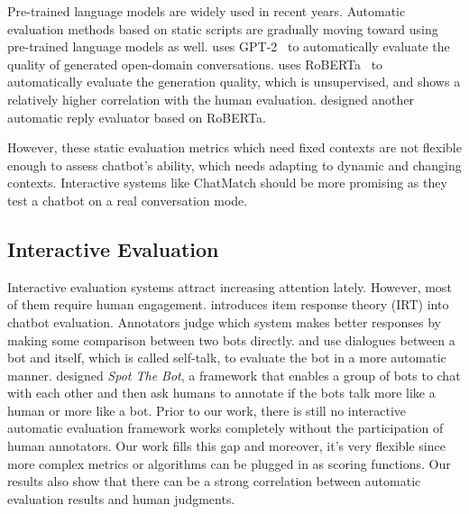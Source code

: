 Pre-trained language models are widely used in recent years.
Automatic evaluation methods based on static scripts are gradually 
moving toward using pre-trained language models as well. 
\citet{pang-etal-2020-towards} uses GPT-2~\citep{gpt2} to 
automatically evaluate the quality of generated open-domain conversations. 
\citet{mehri-eskenazi-2020-usr} uses RoBERTa~\citep{roberta} to 
automatically evaluate the generation quality, which is unsupervised, and shows a
relatively higher correlation with the human evaluation. 
\citet{zhao-etal-2020-designing} designed another automatic reply evaluator based on RoBERTa. 

However, these static evaluation metrics which need fixed contexts are not 
flexible enough to assess chatbot's ability, which needs adapting to dynamic and changing
contexts. Interactive systems like ChatMatch should be more 
promising as they test a chatbot on a real conversation mode. 

\subsection{Interactive Evaluation}
Interactive evaluation systems attract increasing attention lately. 
However, most of them require human engagement. 
\citet{sedoc-ungar-2020-item} introduces item response theory (IRT) 
into chatbot evaluation. Annotators judge which system makes better
responses by making some comparison between two bots directly. 
\citet{DBLP:journals/corr/abs-1906-09308} and 
\citet{deriu-cieliebak-2019-towards} use dialogues between a bot and itself, 
which is called self-talk, to evaluate the bot in a more automatic manner. 
\citet{deriu-etal-2020-spot} designed \textit{Spot The Bot}, 
a framework that enables a group of bots to chat with each other and 
then ask humans to annotate if the bots talk more like a human or more like a
bot. Prior to our work, there is still no interactive automatic evaluation 
framework works completely without the participation of human annotators. 
Our work fills this gap and moreover, it's very flexible since more complex
metrics or algorithms can be plugged in as scoring functions.
Our results also show that there can be a strong 
correlation between automatic evaluation results and human judgments.
